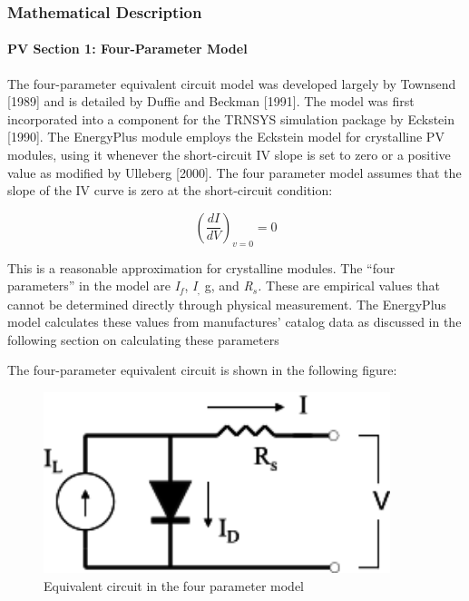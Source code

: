\subsubsection{Mathematical Description}\label{mathematical-description-1}

\paragraph{PV Section 1: Four-Parameter Model}\label{pv-section-1-four-parameter-model}

The four-parameter equivalent circuit model was developed largely by Townsend {[}1989{]} and is detailed by Duffie and Beckman {[}1991{]}. The model was first incorporated into a component for the TRNSYS simulation package by Eckstein {[}1990{]}. The EnergyPlus module employs the Eckstein model for crystalline PV modules, using it whenever the short-circuit IV slope is set to zero or a positive value as modified by Ulleberg {[}2000{]}. The four parameter model assumes that the slope of the IV curve is zero at the short-circuit condition:

\begin{equation}
{\left( {\frac{{dI}}{{dV}}} \right)_{v = 0}} = 0
\end{equation}

This is a reasonable approximation for crystalline modules. The ``four parameters'' in the model are \emph{I\(_{f}\)}, \emph{I\(_{,}\)} g, and \emph{R\(_{s}\).} These are empirical values that cannot be determined directly through physical measurement. The EnergyPlus model calculates these values from manufactures' catalog data as discussed in the following section on calculating these parameters

The four-parameter equivalent circuit is shown in the following figure:

\begin{figure}[hbtp] %
\centering
\includegraphics[width=0.9\textwidth, height=0.9\textheight, keepaspectratio=true]{media/image7592.svg.png}
\caption{Equivalent circuit in the four parameter model \protect \label{fig:equivalent-circuit-in-the-four-parameter}}
\end{figure}

